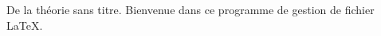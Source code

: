 \begin{theory}
	De la théorie sans titre. Bienvenue dans ce programme de gestion de fichier
	\LaTeX.
\end{theory}
